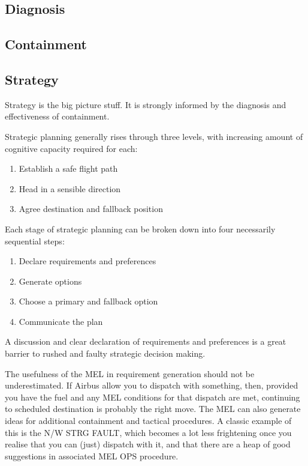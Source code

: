 \documentclass[a5paper,11pt,titlepage]{article}
\begin{document}
\subsection{Diagnosis}

\subsection{Containment}
\subsection{Strategy}

Strategy is the big picture stuff. It is strongly informed by the
diagnosis and effectiveness of containment.

Strategic planning generally rises through three levels, with increasing
amount of cognitive capacity required for each:

\begin{enumerate}
\item Establish a safe flight path
\item Head in a sensible direction
\item Agree destination and fallback position
\end{enumerate}

Each stage of strategic planning can be broken down into four
necessarily sequential steps:

\begin{enumerate}
\item Declare requirements and preferences
\item Generate options
\item Choose a primary and fallback option
\item Communicate the plan
\end{enumerate}

A discussion and clear declaration of requirements and preferences is a
great barrier to rushed and faulty strategic decision making.

The usefulness of the MEL in requirement generation should not be
underestimated. If Airbus allow you to dispatch with something, then,
provided you have the fuel and any MEL conditions for that dispatch are
met, continuing to scheduled destination is probably the right move. The
MEL can also generate ideas for additional containment and tactical
procedures. A classic example of this is the N/W STRG FAULT, which
becomes a lot less frightening once you realise that you can (just)
dispatch with it, and that there are a heap of good suggestions in
associated MEL OPS procedure.
\end{document}
